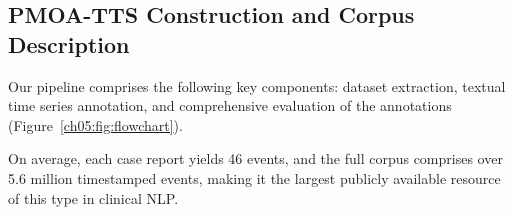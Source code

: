 \subsection{PMOA-TTS Construction and Corpus Description}
\label{ch05:sec:methods}

Our pipeline comprises the following key components: dataset extraction, textual time series annotation, and comprehensive evaluation of the annotations (Figure~\ref{ch05:fig:flowchart}).




On average, each case report yields 46 events, and the full corpus comprises over 5.6 million timestamped events, making it the largest publicly available resource of this type in clinical NLP.
